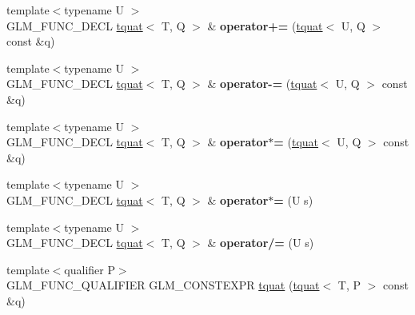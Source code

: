 \begin{DoxyCompactItemize}
\item 
\mbox{\label{structglm_1_1tquat_af04015f0ca99c3792a7af3061d3508bb}} 
{\footnotesize template$<$typename U $>$ }\\G\+L\+M\+\_\+\+F\+U\+N\+C\+\_\+\+D\+E\+CL \hyperlink{structglm_1_1tquat}{tquat}$<$ T, Q $>$ \& {\bfseries operator+=} (\hyperlink{structglm_1_1tquat}{tquat}$<$ U, Q $>$ const \&q)
\item 
\mbox{\label{structglm_1_1tquat_a1f48d26214f6efcb8f1c6a222e45fae1}} 
{\footnotesize template$<$typename U $>$ }\\G\+L\+M\+\_\+\+F\+U\+N\+C\+\_\+\+D\+E\+CL \hyperlink{structglm_1_1tquat}{tquat}$<$ T, Q $>$ \& {\bfseries operator-\/=} (\hyperlink{structglm_1_1tquat}{tquat}$<$ U, Q $>$ const \&q)
\item 
\mbox{\label{structglm_1_1tquat_af1d51deda165d1be3e644353f9c26d55}} 
{\footnotesize template$<$typename U $>$ }\\G\+L\+M\+\_\+\+F\+U\+N\+C\+\_\+\+D\+E\+CL \hyperlink{structglm_1_1tquat}{tquat}$<$ T, Q $>$ \& {\bfseries operator$\ast$=} (\hyperlink{structglm_1_1tquat}{tquat}$<$ U, Q $>$ const \&q)
\item 
\mbox{\label{structglm_1_1tquat_aceb92eef28cbd87273cf81bf0bd71fde}} 
{\footnotesize template$<$typename U $>$ }\\G\+L\+M\+\_\+\+F\+U\+N\+C\+\_\+\+D\+E\+CL \hyperlink{structglm_1_1tquat}{tquat}$<$ T, Q $>$ \& {\bfseries operator$\ast$=} (U s)
\item 
\mbox{\label{structglm_1_1tquat_aed8e8a44af5bcae23e60b4ddc170e762}} 
{\footnotesize template$<$typename U $>$ }\\G\+L\+M\+\_\+\+F\+U\+N\+C\+\_\+\+D\+E\+CL \hyperlink{structglm_1_1tquat}{tquat}$<$ T, Q $>$ \& {\bfseries operator/=} (U s)
\item 
\mbox{\label{structglm_1_1tquat_ab59e0622b75684ae91e699d2f4b41cef}} 
{\footnotesize template$<$qualifier P$>$ }\\G\+L\+M\+\_\+\+F\+U\+N\+C\+\_\+\+Q\+U\+A\+L\+I\+F\+I\+ER G\+L\+M\+\_\+\+C\+O\+N\+S\+T\+E\+X\+PR \hyperlink{structglm_1_1tquat_ab59e0622b75684ae91e699d2f4b41cef}{tquat} (\hyperlink{structglm_1_1tquat}{tquat}$<$ T, P $>$ const \&q)

\end{DoxyCompactItemize}
